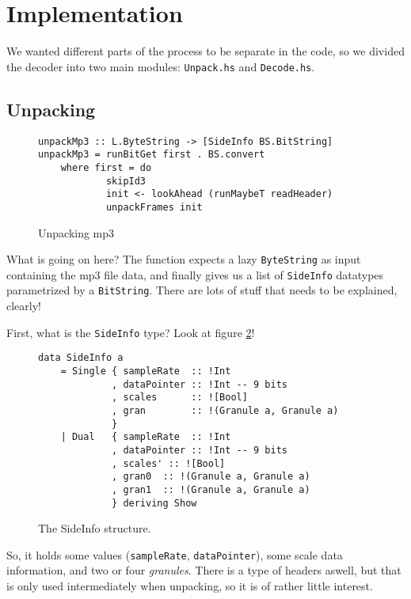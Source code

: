 \documentclass[a4paper,12pt]{article}
\begin{document}
\section{Implementation}
    We wanted different parts of the process to be separate in the code, so we
    divided the decoder into two main modules: \texttt{Unpack.hs} and
    \texttt{Decode.hs}.

    \subsection{Unpacking}
\begin{figure}[H]
  \begin{center}
    \begin{lstlisting}
unpackMp3 :: L.ByteString -> [SideInfo BS.BitString]
unpackMp3 = runBitGet first . BS.convert
    where first = do
            skipId3
            init <- lookAhead (runMaybeT readHeader)
            unpackFrames init
    \end{lstlisting}
    \caption{Unpacking mp3}\label{fig:unpacking_mp3}
  \end{center}
\end{figure}

    What is going on here? The function expects a lazy \texttt{ByteString} as
    input containing the mp3 file data, and finally gives us a list of
    \texttt{SideInfo} datatypes parametrized by a \texttt{BitString}. There are
    lots of stuff that needs to be explained, clearly!

    First, what is the \texttt{SideInfo} type? Look at
    figure \ref{fig:sideinfo_struct}!
\begin{figure}[H]
  \begin{center}
    \begin{lstlisting}
data SideInfo a
    = Single { sampleRate  :: !Int
             , dataPointer :: !Int -- 9 bits
             , scales      :: ![Bool]
             , gran        :: !(Granule a, Granule a)
             }
    | Dual   { sampleRate  :: !Int
             , dataPointer :: !Int -- 9 bits
             , scales' :: ![Bool]
             , gran0  :: !(Granule a, Granule a)
             , gran1  :: !(Granule a, Granule a)
             } deriving Show
    \end{lstlisting}
    \caption{The SideInfo structure.}\label{fig:sideinfo_struct}
  \end{center}
\end{figure}
    So, it holds some values (\texttt{sampleRate}, \texttt{dataPointer}), some
    scale data information, and two or four \textit{granules}. There is a type
    of headers aswell, but that is only used intermediately when unpacking, so
    it is of rather little interest. 
\end{document}
